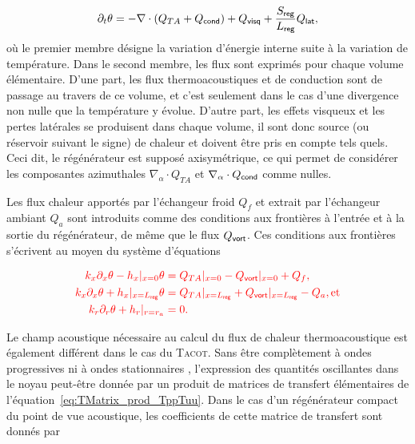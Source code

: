 \begin{equation}
[\Phi\rho_0 C_p + (1-\Phi)\rho_s C_s]\partial_t \theta = - \nabla \cdot (Q_{TA} + Q_{\sf cond}) + Q_{\sf visq} + \frac{S_{\sf reg}}{L_{\sf reg}}Q_{\sf lat},
\label{eq:BilanChaleur_LottonPoignand}
\end{equation}
où le premier membre désigne la variation d'énergie interne suite à la variation de température. Dans le second membre, les flux sont exprimés pour chaque volume élémentaire. D'une part, les flux thermoacoustiques et de conduction sont \og de passage \fg{} au travers de ce volume, et c'est seulement dans le cas d'une divergence non nulle que la température y évolue. D'autre part, les effets visqueux et les pertes latérales se produisent dans chaque volume, il sont donc source (ou réservoir suivant le signe) de chaleur et doivent être pris en compte tels quels. Ceci dit, le régénérateur est supposé axisymétrique, ce qui permet de considérer les composantes azimuthales $\nabla_\alpha \cdot Q_{TA}$ et $\nabla_\alpha \cdot Q_{\sf cond}$ comme nulles.


Les flux chaleur apportés par l'échangeur froid $Q_f$ et extrait par l'échangeur ambiant $Q_a$ sont introduits comme des conditions aux frontières à l'entrée et à la sortie du régénérateur, de même que le flux $Q_{\sf vort}$. Ces conditions aux frontières s'écrivent au moyen du système d'équations

\begin{subequations} \color{red}
	\begin{align}
		k_x \partial_x \theta - h_{x}|_{x=0}\theta &= Q_{TA}|_{x=0} - Q_{\sf vort}|_{x=0} + Q_f, \label{eq:CondFront_x_0Froid}\\
		k_x \partial_x \theta + h_{x}|_{x=L_{\sf reg}}\theta &= Q_{TA}|_{x=L_{\sf reg}}  + Q_{\sf vort}|_{x=L_{\sf reg}} - Q_a, \text{et} \label{eq:CondFront_x_LregAmb}\\
		k_r \partial_r \theta + h_{r}|_{r=r_a} &= 0. \label{eq:CondFront_r_ra}
	\end{align}
	\label{eq:CondFront}%
\end{subequations}



Le champ acoustique nécessaire au calcul du flux de chaleur thermoacoustique est également différent dans le cas du \textsc{Tacot}. Sans être complètement \og à ondes progressives \fg{} ni \og à ondes stationnaires \fg{}, l'expression des quantités oscillantes dans le noyau peut-être donnée par un produit de matrices de transfert élémentaires de l'équation~\eqref{eq:TMatrix_prod_TppTuu}. Dans le cas d'un régénérateur compact du point de vue acoustique, les coefficients de cette matrice de transfert sont donnés par

